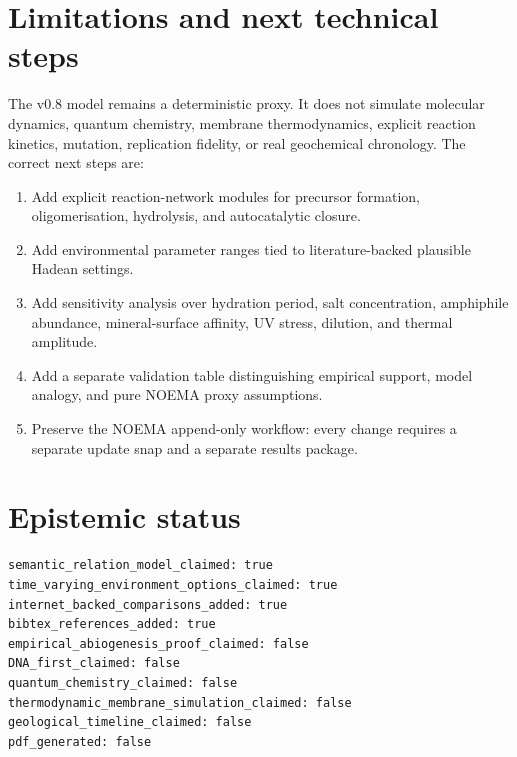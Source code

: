 \documentclass[11pt]{article}
\begin{document}
\section{Limitations and next technical steps}
The v0.8 model remains a deterministic proxy. It does not simulate molecular dynamics, quantum chemistry, membrane thermodynamics, explicit reaction kinetics, mutation, replication fidelity, or real geochemical chronology. The correct next steps are:
\begin{enumerate}[leftmargin=*]
  \item Add explicit reaction-network modules for precursor formation, oligomerisation, hydrolysis, and autocatalytic closure.
  \item Add environmental parameter ranges tied to literature-backed plausible Hadean settings.
  \item Add sensitivity analysis over hydration period, salt concentration, amphiphile abundance, mineral-surface affinity, UV stress, dilution, and thermal amplitude.
  \item Add a separate validation table distinguishing empirical support, model analogy, and pure NOEMA proxy assumptions.
  \item Preserve the NOEMA append-only workflow: every change requires a separate update snap and a separate results package.
\end{enumerate}

\section{Epistemic status}
\begin{verbatim}
semantic_relation_model_claimed: true
time_varying_environment_options_claimed: true
internet_backed_comparisons_added: true
bibtex_references_added: true
empirical_abiogenesis_proof_claimed: false
DNA_first_claimed: false
quantum_chemistry_claimed: false
thermodynamic_membrane_simulation_claimed: false
geological_timeline_claimed: false
pdf_generated: false
\end{verbatim}



\end{document}

